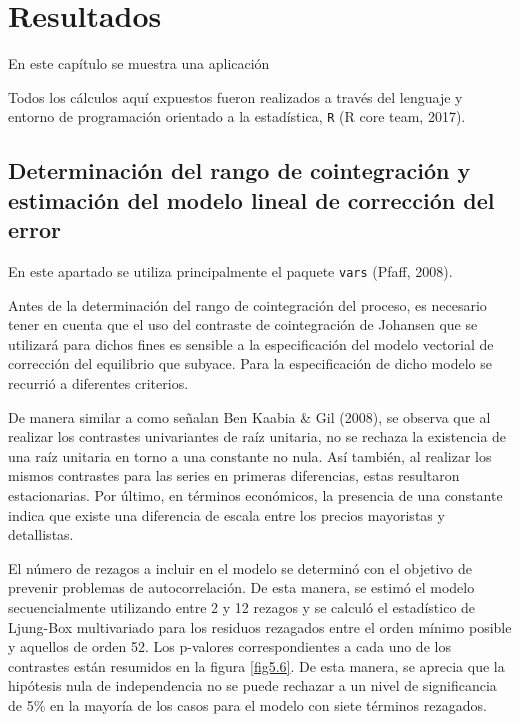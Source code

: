 \chapter{Resultados}

En este capítulo se muestra una aplicación

Todos los cálculos aquí expuestos fueron realizados a través del lenguaje y entorno de programación orientado a la estadística, \texttt{R} (R core team, 2017).


\section{Determinación del rango de cointegración y estimación del modelo lineal de corrección del error}

En este apartado se utiliza principalmente el paquete \texttt{vars} (Pfaff, 2008). 

Antes de la determinación del rango de cointegración del proceso, es necesario tener en cuenta que el uso del contraste de cointegración de Johansen que se utilizará para dichos fines es sensible a la especificación del modelo vectorial de corrección del equilibrio que subyace. Para la especificación de dicho modelo se recurrió a diferentes criterios. 

De manera similar a como señalan Ben Kaabia \& Gil (2008), se observa que al realizar los contrastes univariantes de raíz unitaria, no se rechaza la existencia de una raíz unitaria en torno a una constante no nula. Así también, al realizar los mismos contrastes para las series en primeras diferencias, estas resultaron estacionarias. Por último, en términos económicos, la presencia de una constante indica que existe una diferencia de escala entre los precios mayoristas y detallistas. 

El número de rezagos a incluir en el modelo se determinó con el objetivo de prevenir problemas de autocorrelación. De esta manera, se estimó el modelo secuencialmente utilizando entre 2 y  12 rezagos y se calculó el estadístico de Ljung-Box multivariado para los residuos rezagados entre el orden mínimo posible y aquellos de orden 52. Los p-valores correspondientes a cada uno de los contrastes están resumidos en la figura \ref{fig5.6}. De esta manera, se aprecia que la hipótesis nula de independencia no se puede rechazar a un nivel de significancia de 5\% en la mayoría de los casos para el modelo con siete términos rezagados. 

